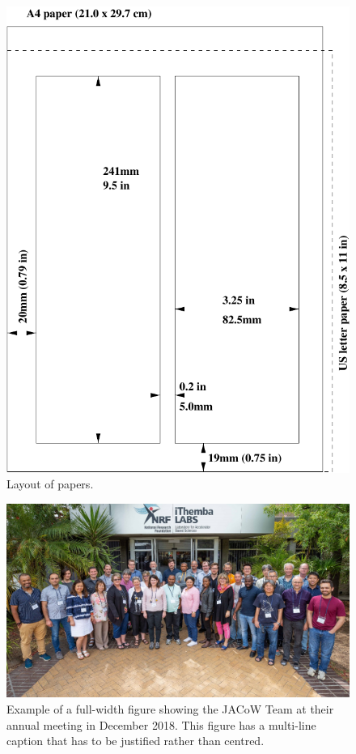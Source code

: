\begin{figure}[!htb]
   \centering
   \includegraphics*[width=.7\columnwidth]{JACpic_mc}
   \caption{Layout of papers.}
   \label{fig:paper_layout}
\end{figure}

\begin{figure}[!tbh]
    \centering
    \includegraphics*[width=\textwidth]{JACpic2}

    \caption{Example of a full-width figure showing the JACoW Team at their annual
    	     meeting in December 2018. This figure has a multi-line caption that has to be
    	     justified rather than centred.}
    \label{fig:jacow_team}
\end{figure}

